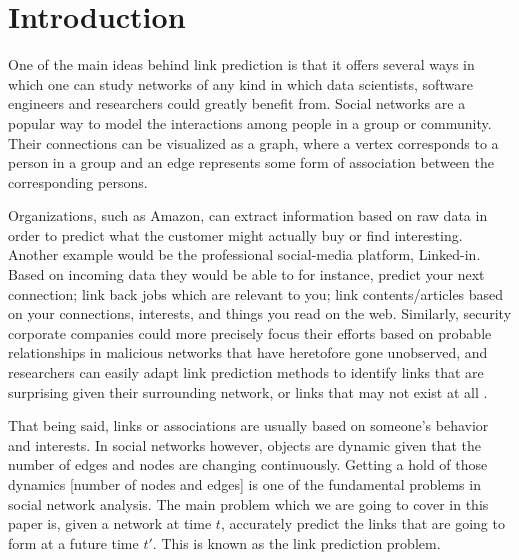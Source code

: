 \documentclass{acm_proc_article-sp}
\begin{document}


\section{Introduction}
\label{Sect.1}

One of the main ideas behind link prediction is that it offers several ways in which one can study networks of any kind in which data scientists, software engineers and researchers could greatly benefit from. Social networks are a popular way to model the interactions among people in a group or community. Their connections can be visualized as a graph, where a vertex corresponds to a person in a group and an edge represents some form of association between the corresponding persons.

Organizations, such as Amazon, can extract information based on raw data in order to predict what the customer might actually buy or find interesting. Another example would be the professional social-media platform, Linked-in.  Based on incoming data they would be able to for instance, predict your next connection; link back jobs which are relevant to you; link contents/articles based on your connections, interests, and things you read on the web. Similarly, security corporate companies could more precisely focus their efforts based on probable relationships in malicious networks that have heretofore gone unobserved, and researchers can easily adapt link prediction methods to identify links that are surprising given their surrounding network, or links that may not exist at all \cite{Lichtenwalter:2010:NPM:1835804.1835837}. 

That being said, links or associations are usually based on someone's behavior and interests. In social networks however, objects are dynamic given that the number of edges and nodes are changing continuously. Getting a hold of those dynamics [number of nodes and edges] is one of the fundamental problems in social network analysis. The main problem which we are going to cover in this paper is, given a network at time $t$, accurately predict the links that are going to form at a future time $t'$. This is known as the link prediction problem.
\end{document}
